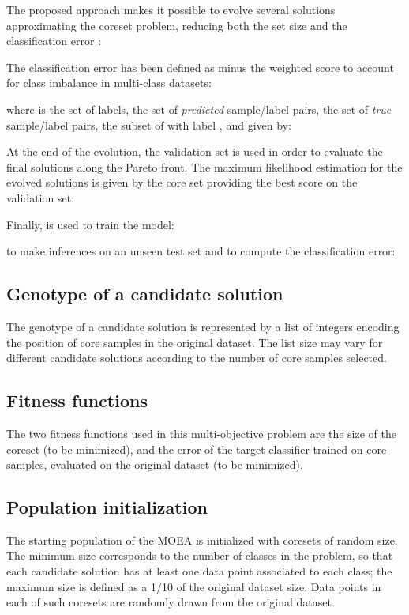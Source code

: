 \documentclass{article}
\begin{document}
The proposed approach makes it possible to evolve several solutions  approximating the coreset problem, reducing both the set size and the classification error :

The classification error has been defined as  minus the weighted  score \cite{sorensen1948method,chinchor1991muc} to account for class imbalance in multi-class datasets:

where  is the set of labels,  the set of \textit{predicted} sample/label pairs,  the set of \textit{true} sample/label pairs,  the subset of  with label , and  given by:


At the end of the evolution, the validation set  is used in order to evaluate the final solutions along the Pareto front. The maximum likelihood estimation for the evolved solutions is given by the core set providing the best score on the validation set:

Finally,  is used to train the model:

to make inferences on an unseen test set  and to compute the classification error:




\subsection{Genotype of a candidate solution}
\label{ssec:alberto:genotype_of_a_candidate_solution}
The genotype of a candidate solution is represented by a list of integers encoding the position of core samples in the original dataset. The list size may vary for different candidate solutions according to the number of core samples selected.


\subsection{Fitness functions}
\label{ssec:alberto:fitness_functions}
The two fitness functions used in this multi-objective problem are the size of the coreset (to be minimized), and the error of the target classifier trained on core samples, evaluated on the original dataset (to be minimized).

\subsection{Population initialization}
\label{ssec:alberto:population_initialization}
The starting population of the MOEA is initialized with coresets of random size. The minimum size corresponds to the number of classes in the problem, so that each candidate solution has at least one data point associated to each class; the maximum size is defined as a 1/10 of the original dataset size. Data points in each of such coresets are randomly drawn from the original dataset.
\end{document}
